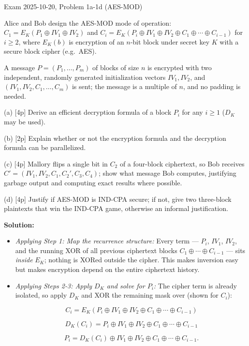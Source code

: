 \documentclass[12pt, a4paper]{article}
\begin{document}
\begin{practicebox}{Exam 2025-10-20, Problem 1a-1d (AES-MOD)}
\begin{problembox}
Alice and Bob design the AES-MOD mode of operation: $C_1 = E_K(P_1 \oplus IV_1 \oplus IV_2)$ and $C_i = E_K(P_i \oplus IV_1 \oplus IV_2 \oplus C_1 \oplus \cdots \oplus C_{i-1})$ for $i \geq 2$, where $E_K(b)$ is encryption of an $n$-bit block under secret key $K$ with a secure block cipher (e.g.\ AES).

A message $P = (P_1, \dots, P_m)$ of blocks of size $n$ is encrypted with two independent, randomly generated initialization vectors $IV_1, IV_2$, and $(IV_1, IV_2, C_1, \dots, C_m)$ is sent; the message is a multiple of $n$, and no padding is needed.

(a) [4p] Derive an efficient decryption formula of a block $P_i$ for any $i \geq 1$ ($D_K$ may be used).

(b) [2p] Explain whether or not the encryption formula and the decryption formula can be parallelized.

(c) [4p] Mallory flips a single bit in $C_2$ of a four-block ciphertext, so Bob receives $C' = (IV_1, IV_2, C_1, C_2', C_3, C_4)$; show what message Bob computes, justifying garbage output and computing exact results where possible.

(d) [4p] Justify if AES-MOD is IND-CPA secure; if not, give two three-block plaintexts that win the IND-CPA game, otherwise an informal justification.
\end{problembox}

\textbf{Solution:}
\begin{itemize}
    \item \textit{Applying Step 1: Map the recurrence structure:} Every term --- $P_i$, $IV_1$, $IV_2$, and the running XOR of all previous ciphertext blocks $C_1 \oplus \cdots \oplus C_{i-1}$ --- sits \emph{inside} $E_K$; nothing is XORed outside the cipher. This makes inversion easy but makes encryption depend on the entire ciphertext history.
    \item \textit{Applying Steps 2-3: Apply $D_K$ and solve for $P_i$:} The cipher term is already isolated, so apply $D_K$ and XOR the remaining mask over (shown for $C_i$):

\[
C_i = E_K(P_i \oplus IV_1 \oplus IV_2 \oplus C_1 \oplus \cdots \oplus C_{i-1})
\]

\[
D_K(C_i) = P_i \oplus IV_1 \oplus IV_2 \oplus C_1 \oplus \cdots \oplus C_{i-1}
\]

\[
P_i = D_K(C_i) \oplus IV_1 \oplus IV_2 \oplus C_1 \oplus \cdots \oplus C_{i-1}.
\]


\end{itemize}
\end{practicebox}
\end{document}
